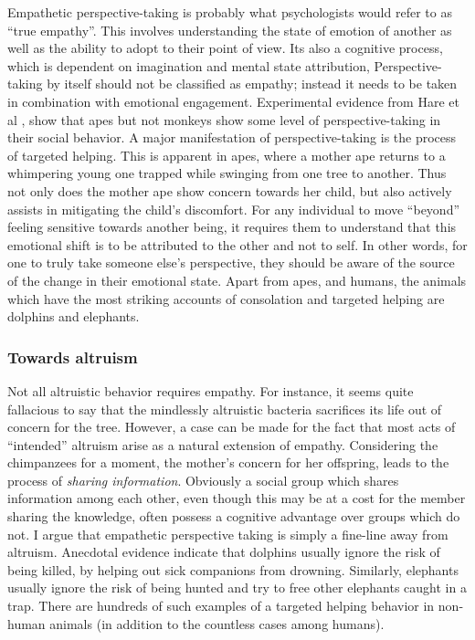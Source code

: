 \documentclass[12pt, letter]{article}
\begin{document}
Empathetic perspective-taking is probably what psychologists would refer to as ``true empathy''. This involves understanding the state of emotion of another as well as the ability to adopt to their point of view. Its also a cognitive process, which is dependent on imagination and mental state attribution, Perspective-taking by itself should not be classified as empathy; instead it needs to be taken in combination with emotional engagement. Experimental evidence from Hare et al \cite{hare2001chimpanzees}, show that apes but not monkeys show some level of perspective-taking in their social behavior. A major manifestation of perspective-taking is the process of targeted helping. This is apparent in apes, where a mother ape returns to a whimpering young one trapped while swinging from one tree to another. Thus not only does the mother ape show concern towards her child, but also actively assists in mitigating the child's discomfort. For any individual to move ``beyond'' feeling sensitive towards another being, it requires them to understand that this emotional shift is to be attributed to the other and not to self. In other words, for one to truly take someone else's perspective, they should be aware of the source of the change in their emotional state. Apart from apes, and humans, the animals which have the most striking accounts of consolation and targeted helping are dolphins and elephants.

\subsubsection*{Towards altruism}
Not all altruistic behavior requires empathy. For instance, it seems quite fallacious to say that the mindlessly altruistic bacteria sacrifices its life out of concern for the tree. However, a case can be made for the fact that most acts of ``intended'' altruism arise as a natural extension of empathy. Considering the chimpanzees for a moment, the mother's concern for her offspring, leads to the process of \emph{sharing information}. Obviously a social group which shares information among each other, even though this may be at a cost for the member sharing the knowledge, often possess a cognitive advantage over groups which do not. I argue that empathetic perspective taking is simply a fine-line away from altruism. Anecdotal evidence indicate that dolphins usually ignore the risk of being killed, by helping out sick companions from drowning. Similarly, elephants usually ignore the risk of being hunted and try to free other elephants caught in a trap. There are hundreds of such examples of a targeted helping behavior in non-human animals (in addition to the countless cases among humans).
\end{document}
